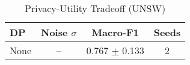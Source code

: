 \begin{table}[htbp]
\centering
\caption{Privacy-Utility Tradeoff (UNSW)}\label{tab:privacy_unsw}
\begin{tabular}{lccc}
\toprule
DP & Noise $\sigma$ & Macro-F1 & Seeds \\
\midrule
None & -- & 0.767 $\pm$ 0.133 & 2 \\
\bottomrule
\end{tabular}
\end{table}
